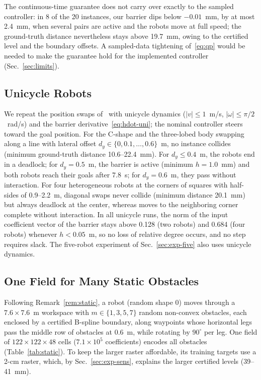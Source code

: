 \documentclass[journal]{IEEEtran}
\theoremstyle{definition}
\begin{document}
The continuous-time guarantee does not carry over exactly to the sampled controller: in 8 of the 20
instances, our barrier dips below $-0.01$~mm, by at most 2.4~mm, when several pairs are active and
the robots move at full speed; the ground-truth distance nevertheless stays above 19.7~mm, owing to
the certified level and the boundary offsets. A sampled-data tightening of~\eqref{eq:qp} would be
needed to make the guarantee hold for the implemented controller (Sec.~\ref{sec:limits}).

\subsection{Unicycle Robots}\label{sec:exp-unicycle}
We repeat the position swaps of~\cite{jo2026geometry} with unicycle dynamics ($|v|\le1$~m/s,
$|\omega|\le\pi/2$~rad/s) and the barrier derivative~\eqref{eq:hdot-uni}; the nominal controller steers
toward the goal position. For the C-shape and the three-lobed body swapping along a line with lateral
offset $d_y\in\{0,0.1,\dots,0.6\}$~m, no instance collides (minimum ground-truth distance
10.6--22.4~mm). For $d_y\le0.4$~m, the robots end in a deadlock; for $d_y=0.5$~m, the barrier is active
(minimum $h=1.0$~mm) and both robots reach their goals after 7.8~s; for
$d_y=0.6$~m, they pass without interaction. For four heterogeneous robots at the corners of squares
with half-sides of 0.9--2.2~m, diagonal swaps never collide (minimum distance 20.1~mm) but always
deadlock at the center, whereas moves to the neighboring corner complete without interaction. In all
unicycle runs, the norm of the input coefficient vector of the barrier stays above 0.128 (two robots)
and 0.684 (four robots) whenever $h<0.05$~m, so no loss of relative degree occurs, and no step
requires slack. The five-robot experiment of Sec.~\ref{sec:exp-five} also uses unicycle dynamics.
\subsection{One Field for Many Static Obstacles}\label{sec:exp-static}
Following Remark~\ref{rem:static}, a robot (random shape 0) moves through a $7.6\times7.6$~m
workspace with $m\in\{1,3,5,7\}$ random non-convex obstacles, each enclosed by a certified B-spline
boundary, along waypoints whose horizontal legs pass the middle row of obstacles at 0.6~m, while
rotating by $90^\circ$ per leg. One field of $122\times122\times48$ cells
($7.1\times10^5$ coefficients) encodes all obstacles (Table~\ref{tab:static}). To keep the larger
raster affordable, its training targets use a 2-cm raster, which, by Sec.~\ref{sec:exp-sens},
explains the larger certified levels (39--41~mm).
\end{document}
